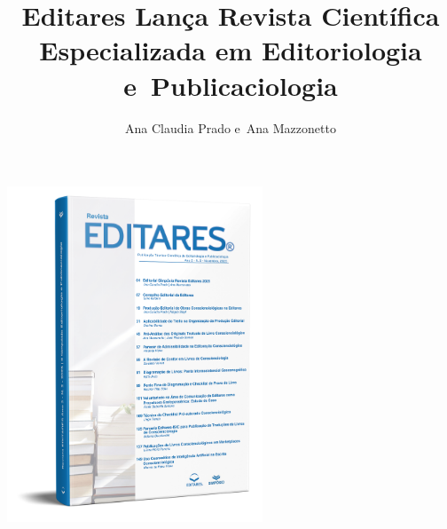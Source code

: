 \documentclass{gescons}
\author{Ana Claudia Prado e~Ana Mazzonetto}
\title{Editares Lança Revista Científica Especializada em Editoriologia e~Publicaciologia}
\begin{document}
    \makeentrevistatitle


    
    
\begin{center}
    \includegraphics[height=10cm]{articles/atualizacoes/fotos/materia6/revista_editares_2025} 
\end{center}
    
\end{document}
